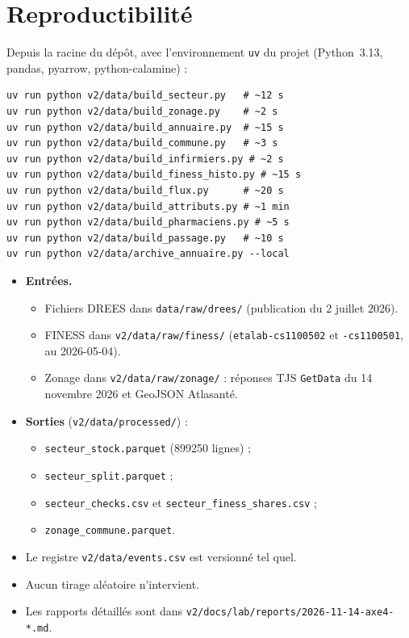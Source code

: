 \documentclass[11pt]{article}
\begin{document}
\section{Reproductibilité}
Depuis la racine du dépôt, avec l'environnement \texttt{uv} du projet (Python~3.13, pandas, pyarrow,
python-calamine) :
\begin{verbatim}
uv run python v2/data/build_secteur.py   # ~12 s
uv run python v2/data/build_zonage.py    # ~2 s
uv run python v2/data/build_annuaire.py  # ~15 s
uv run python v2/data/build_commune.py   # ~3 s
uv run python v2/data/build_infirmiers.py # ~2 s
uv run python v2/data/build_finess_histo.py # ~15 s
uv run python v2/data/build_flux.py      # ~20 s
uv run python v2/data/build_attributs.py # ~1 min
uv run python v2/data/build_pharmaciens.py # ~5 s
uv run python v2/data/build_passage.py   # ~10 s
uv run python v2/data/archive_annuaire.py --local
\end{verbatim}
\begin{itemize}
  \item \textbf{Entrées.}
  \begin{itemize}
    \item Fichiers DREES dans \texttt{data/raw/drees/} (publication du 2 juillet 2026).
    \item FINESS dans \texttt{v2/data/raw/finess/} (\texttt{etalab-cs1100502} et \texttt{-cs1100501}, au
    2026-05-04).
    \item Zonage dans \texttt{v2/data/raw/zonage/} : réponses TJS \texttt{GetData} du 14 novembre 2026 et GeoJSON
    Atlasanté.
  \end{itemize}
  \item \textbf{Sorties} (\texttt{v2/data/processed/}) :
  \begin{itemize}
    \item \texttt{secteur\_stock.parquet} (\num{899250} lignes) ;
    \item \texttt{secteur\_split.parquet} ;
    \item \texttt{secteur\_checks.csv} et \texttt{secteur\_finess\_shares.csv} ;
    \item \texttt{zonage\_commune.parquet}.
  \end{itemize}
  \item Le registre \texttt{v2/data/events.csv} est versionné tel quel.
  \item Aucun tirage aléatoire n'intervient.
  \item Les rapports détaillés sont dans \texttt{v2/docs/lab/reports/2026-11-14-axe4-*.md}.
\end{itemize}
\end{document}
